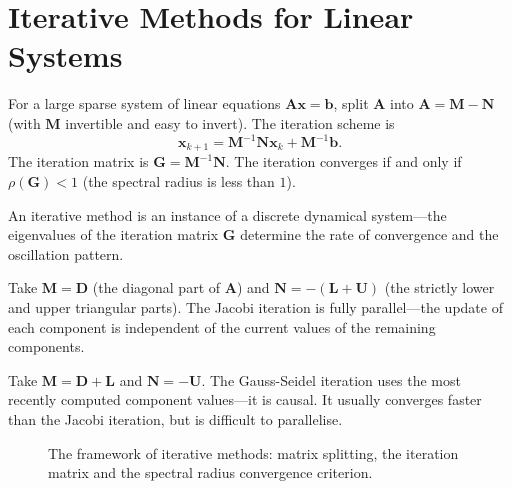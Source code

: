 \section{\texorpdfstring{Iterative Methods for Linear Systems}{Iterative Methods for Linear Systems}}

\begin{definition}\label{def:iterative_method}
For a large sparse system of linear equations $\mathbf{A}\mathbf{x} = \mathbf{b}$, split $\mathbf{A}$ into $\mathbf{A} = \mathbf{M} - \mathbf{N}$ (with $\mathbf{M}$ invertible and easy to invert). The iteration scheme is
\[
\mathbf{x}_{k+1} = \mathbf{M}^{-1} \mathbf{N} \mathbf{x}_k + \mathbf{M}^{-1} \mathbf{b}.
\]
The iteration matrix is $\mathbf{G} = \mathbf{M}^{-1} \mathbf{N}$. The iteration converges if and only if $\rho(\mathbf{G}) < 1$ (the spectral radius is less than $1$).

An iterative method is an instance of a discrete dynamical system---the eigenvalues of the iteration matrix $\mathbf{G}$ determine the rate of convergence and the oscillation pattern.
\end{definition}

\begin{definition}\label{def:jacobi_iteration}
Take $\mathbf{M} = \mathbf{D}$ (the diagonal part of $\mathbf{A}$) and $\mathbf{N} = -(\mathbf{L} + \mathbf{U})$ (the strictly lower and upper triangular parts). The Jacobi iteration is fully parallel---the update of each component is independent of the current values of the remaining components.
\end{definition}

\begin{definition}\label{def:gauss_seidel}
Take $\mathbf{M} = \mathbf{D} + \mathbf{L}$ and $\mathbf{N} = -\mathbf{U}$. The Gauss-Seidel iteration uses the most recently computed component values---it is causal. It usually converges faster than the Jacobi iteration, but is difficult to parallelise.
\end{definition}

\begin{figure}[htbp]
\centering
{}
\caption{The framework of iterative methods: matrix splitting, the iteration matrix and the spectral radius convergence criterion.}
\label{fig:iterative_method}
\end{figure}

